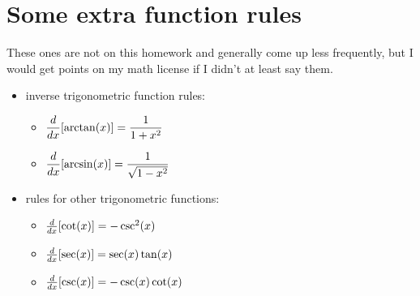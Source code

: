 {{\begin{minipage}{0.45\textwidth}
        \section{Some extra function rules} 
        These ones are not on this homework and generally come up less frequently, but I would get points on my math license if I didn't at least say them.
        \begin{itemize}[leftmargin=15pt, label=\(\centerdot\)]
            \item inverse trigonometric function rules: 
            \begin{itemize}[label=\textopenbullet]
                \item $\displaystyle \frac{d}{dx}[\arctan(x)] = \frac{1}{1+x^2}$
                \item $\displaystyle \frac{d}{dx}[\arcsin(x)] = \frac{1}{\sqrt{1-x^2}}$
            \end{itemize}
            \item rules for other trigonometric functions:
            \begin{itemize}[label=\textopenbullet]
                \item $\frac{d}{dx}[\cot(x)]=-\csc^2(x)$
                \item $\frac{d}{dx}[\sec(x)]=\sec(x)\tan(x)$
                \item $\frac{d}{dx}[\csc(x)]=-\csc(x)\cot(x)$
            \end{itemize}
        \end{itemize}
    \end{minipage}
    }
}


